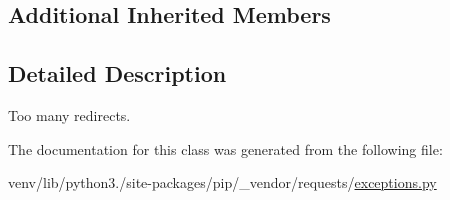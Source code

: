 \subsection*{Additional Inherited Members}


\subsection{Detailed Description}
\begin{DoxyVerb}Too many redirects.\end{DoxyVerb}
 

The documentation for this class was generated from the following file\+:\begin{DoxyCompactItemize}
\item 
venv/lib/python3./site-\/packages/pip/\+\_\+vendor/requests/\hyperlink{pip_2__vendor_2requests_2exceptions_8py}{exceptions.\+py}\end{DoxyCompactItemize}

